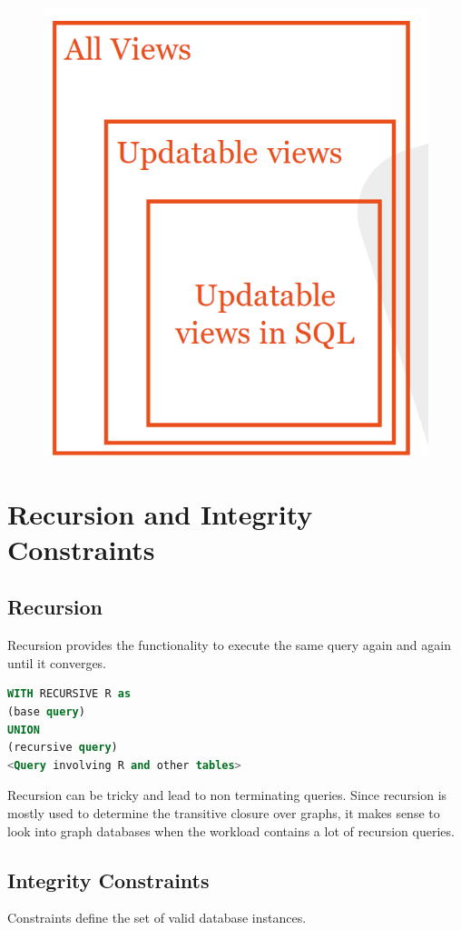 \begin{figure}[H]
\begin{minipage}{.5\textwidth}
\includegraphics[width=.8\textwidth]{images/views.PNG}
\label{views}
\end{minipage}
\end{figure}

\section{Recursion and Integrity Constraints}
\subsection{Recursion}
Recursion provides the functionality to execute the same query again and again until it converges.
\begin{lstlisting}[language=SQL]
WITH RECURSIVE R as
(base query)
UNION
(recursive query)
<Query involving R and other tables>
\end{lstlisting}
Recursion can be tricky and lead to non terminating queries. Since recursion is mostly used to determine the transitive closure over graphs, it makes sense to look into graph databases when the workload contains a lot of recursion queries.

\subsection{Integrity Constraints}
Constraints define the set of valid database instances.

